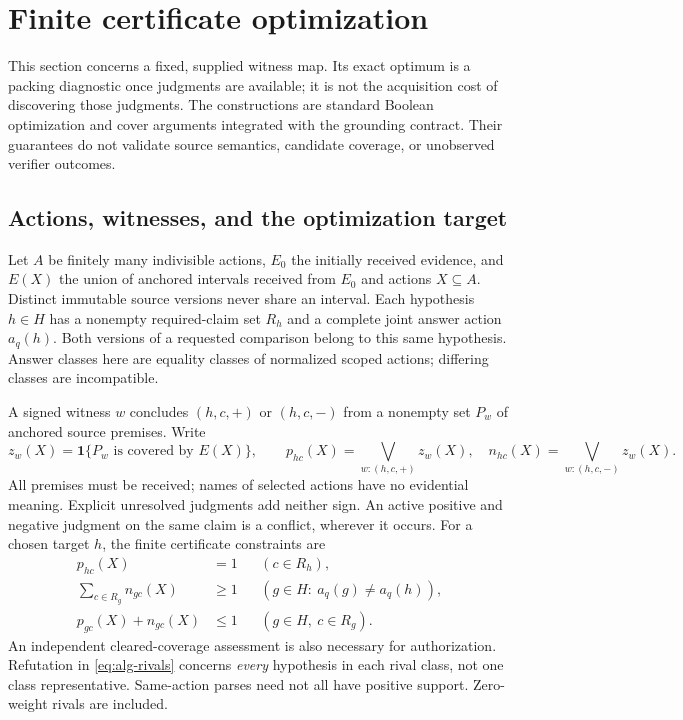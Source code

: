 \section{Finite certificate optimization}
\label{sec:algorithm}

This section concerns a fixed, supplied witness map. Its exact optimum is a
packing diagnostic once judgments are available; it is not the acquisition
cost of discovering those judgments. The constructions are standard Boolean
optimization and cover arguments integrated with the grounding contract.
Their guarantees do not validate source semantics, candidate coverage, or
unobserved verifier outcomes.

\subsection{Actions, witnesses, and the optimization target}

Let $A$ be finitely many indivisible actions, $E_0$ the initially received
evidence, and $E(X)$ the union of anchored intervals received from $E_0$ and
actions $X\subseteq A$. Distinct immutable source versions never share an
interval. Each hypothesis $h\in H$ has a nonempty required-claim set $R_h$
and a complete joint answer action $a_q(h)$. Both versions of a requested
comparison belong to this same hypothesis. Answer classes here are equality
classes of normalized scoped actions; differing classes are incompatible.

A signed witness $w$ concludes $(h,c,+)$ or $(h,c,-)$ from a nonempty set
$P_w$ of anchored source premises. Write
\[
 z_w(X)=\mathbf 1\{P_w\text{ is covered by }E(X)\},\qquad
 p_{hc}(X)=\bigvee_{w:(h,c,+)}z_w(X),\quad
 n_{hc}(X)=\bigvee_{w:(h,c,-)}z_w(X).
\]
All premises must be received; names of selected actions have no evidential
meaning. Explicit unresolved judgments add neither sign. An active positive
and negative judgment on the same claim is a conflict, wherever it occurs.
For a chosen target $h$, the finite certificate constraints are
\begin{align}
 p_{hc}(X)&=1 &&(c\in R_h), \label{eq:alg-support}\\
 \sum_{c\in R_g}n_{gc}(X)&\geq1
       &&(g\in H:\ a_q(g)\neq a_q(h)), \label{eq:alg-rivals}\\
 p_{gc}(X)+n_{gc}(X)&\leq1 &&(g\in H,\ c\in R_g).
       \label{eq:alg-conflicts}
\end{align}
An independent cleared-coverage assessment is also necessary for
authorization. Refutation in \eqref{eq:alg-rivals} concerns \emph{every}
hypothesis in each rival class, not one class representative. Same-action
parses need not all have positive support. Zero-weight rivals are included.

